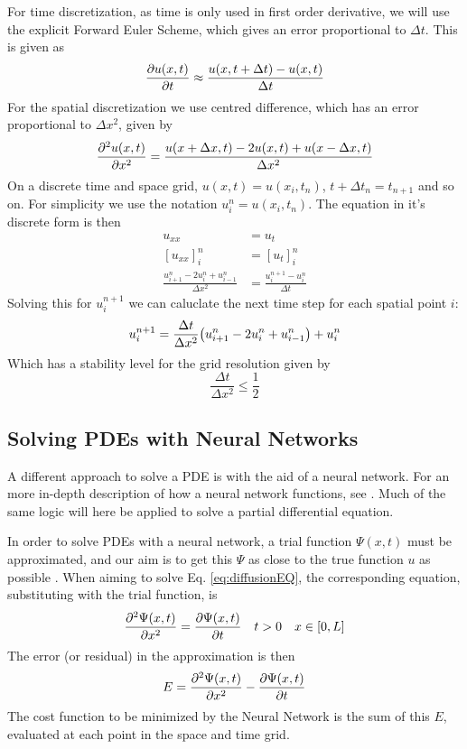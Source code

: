 For time discretization, as time is only used in first order derivative, we will use the explicit Forward Euler Scheme, which gives an error proportional to $\Delta t$. This is given as
\begin{equation}
    \pdv{u(x,t)}{t} \approx \frac{u(x,t+\Delta t) - u(x,t)}{\Delta t}
    \label{eq:FE}
\end{equation}
For the spatial discretization we use centred difference, which has an error proportional to $\Delta x^2$, given by
\begin{equation}
    \pdv[2]{u(x,t)}{x} = \frac{u(x+\Delta x,t) - 2u(x,t) + u(x-\Delta x,t)}{\Delta x^2}
    \label{eq:CD}
\end{equation}
On a discrete time and space grid, $u(x,t) = u(x_i,t_n)$, $t+\Delta t_n = t_{n+1}$ and so on.
For simplicity we use the notation $u_i^n = u(x_i,t_n)$. The equation in it's discrete form is then
\begin{equation}
\begin{split}
    u_{xx} &= u_t \\
    [u_{xx}]_i^n &= [u_t]_i^n \\
    \frac{u_{i+1}^n - 2u_i^n + u_{i-1}^n}{\Delta x^2} &= \frac{u_i^{n+1}-u_i^n}{\Delta t}
\end{split}
\end{equation}
Solving this for $u_i^{n+1}$ we can caluclate the next time step for each spatial point $i$:
\begin{equation}
    u_i^{n+1} = \frac{\Delta t}{\Delta x^2}\qty(u_{i+1}^n - 2u_i^n + u_{i-1}^n)  + u_i^n
    \label{eq:theAlgorithm}
\end{equation}
Which has a stability level for the grid resolution given by
\begin{equation*}
    \frac{\Delta t}{\Delta x^2} \leq \frac{1}{2}
\end{equation*}

\subsection{Solving PDEs with Neural Networks}
A different approach to solve a PDE is with the aid of a neural network. For an more in-depth description of how a neural network functions, see \cite{prosjekt2}. Much of the same logic will here be applied to solve a partial differential equation.

In order to solve PDEs with a neural network, a trial function $\Psi (x,t)$ must be approximated, and our aim is to get this $\Psi$ as close to the true function $u$ as possible \cite{lagaris1998artificial}. When aiming to solve Eq. \eqref{eq:diffusionEQ}, the corresponding equation, substituting with the trial function, is
\begin{equation*}
    \pdv[2]{\Psi(x,t)}{x} = \pdv{\Psi(x,t)}{t} \quad t>0 \quad x\in [0,L]
\end{equation*}
The error (or residual) in the approximation is then
\begin{equation}
    E = \pdv[2]{\Psi(x,t)}{x} - \pdv{\Psi(x,t)}{t}
    \label{eq:errorFunc}
\end{equation}
The cost function to be minimized by the Neural Network is the sum of this $E$, evaluated at each point in the space and time grid.

